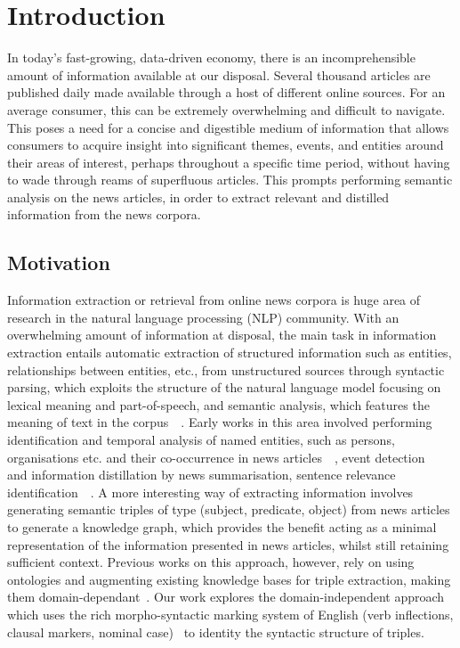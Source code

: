 \chapter{Introduction}
\vspace{-2ex}


In today's fast-growing, data-driven economy, there is an incomprehensible amount of information available at our disposal. Several thousand articles are published daily made available through a host of different online sources. For an average consumer, this can be extremely overwhelming and difficult to navigate. This poses a need for a concise and digestible medium of information that allows consumers to acquire insight into significant themes, events, and entities around their areas of interest, perhaps throughout a specific time period, without having to wade through reams of superfluous articles. This prompts performing semantic analysis on the news articles, in order to extract relevant and distilled information from the news corpora. 

\section{Motivation}

Information extraction or retrieval from online news corpora is huge area of research in the natural language processing (NLP) community. With an overwhelming amount of information at disposal, the main task in information extraction entails automatic extraction of structured information such as entities, relationships between entities, etc., from unstructured sources through syntactic parsing, which exploits the structure of the natural language model focusing on lexical meaning and part-of-speech, and semantic analysis, which features the meaning of text in the corpus~\cite{global_ents_intro}~\cite{sarawagi_info}. Early works in this area involved performing identification and temporal analysis of named entities, such as persons, organisations etc. and their co-occurrence in news articles~\cite{sarawagi_info}~\cite{intro_semntic_analysis_news}, event detection~\cite{finance}~\cite{finance_events} and information distillation by news summarisation, sentence relevance identification~\cite{news_info_extract}~\cite{summary_generation_intro}. A more interesting way of extracting information involves generating semantic triples of type (subject, predicate, object) from news articles to generate a knowledge graph, which provides the benefit acting as a minimal representation of the information presented in news articles, whilst still retaining sufficient context. Previous works on this approach, however, rely on using ontologies and augmenting existing knowledge bases for triple extraction, making them domain-dependant~\cite{wu2020knowledge}. Our work explores the domain-independent approach which uses the rich morpho-syntactic marking system of English (verb inflections, clausal markers, nominal case)~\cite{tseng2014chinese} to identity the syntactic structure of triples. 


